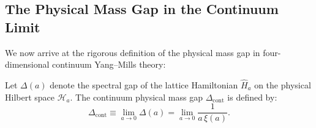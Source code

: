 \subsection{The Physical Mass Gap in the Continuum Limit}
\label{subsec:continuum_mass_gap}

We now arrive at the rigorous definition of the physical mass gap in four-dimensional continuum Yang--Mills theory:

\begin{definition}
\label{def:continuum_mass_gap}
Let $\Delta(a)$ denote the spectral gap of the lattice Hamiltonian $\hat{H}_a$ on the physical Hilbert space $\mathcal{H}_a$. The continuum physical mass gap $\Delta_{\mathrm{cont}}$ is defined by:
\begin{equation}
\label{eq:continuum_gap_def}
\Delta_{\mathrm{cont}} \equiv \lim_{a \to 0} \Delta(a) = \lim_{a \to 0} \frac{1}{a \, \xi(a)}.
\end{equation}
\end{definition}

